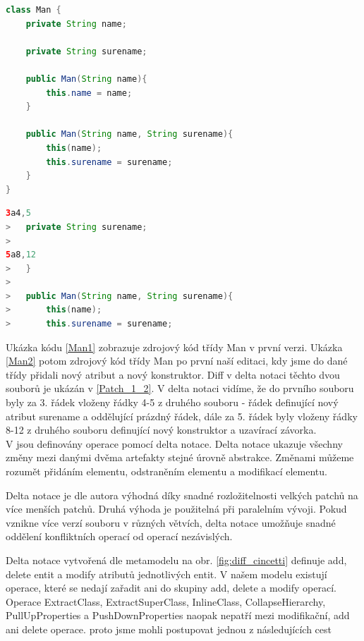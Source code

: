 \documentclass[11pt,twoside,a4paper]{book}
\begin{document}
\begin{lstlisting}[language=JAVA,frame=single,caption=Man2.java,label=Man2]
class Man {
	private String name;

	private String surename;

	public Man(String name){
		this.name = name;
	}

	public Man(String name, String surename){
		this(name);
		this.surename = surename;
	}
}
\end{lstlisting}

\begin{lstlisting}[language=JAVA,frame=single,caption=Patch Man1
Man2,label=Patch_1_2]
3a4,5
> 	private String surename;
> 
5a8,12
> 	}
> 
> 	public Man(String name, String surename){
> 		this(name);
> 		this.surename = surename;	
\end{lstlisting}

Ukázka kódu \ref{Man1} zobrazuje zdrojový kód třídy Man v první
verzi. Ukázka \ref{Man2} potom zdrojový kód třídy Man po první naší editaci,
kdy jsme do dané třídy přidali nový atribut a nový konstruktor.
Diff v delta notaci těchto dvou souborů je ukázán v \ref{Patch_1_2}. V delta
notaci vidíme, že do prvního souboru byly za 3. řádek vloženy řádky 4-5 z
druhého souboru - řádek definující nový atribut surename a oddělující prázdný
řádek, dále za 5. řádek byly vloženy řádky 8-12 z druhého souboru definující
nový konstruktor a uzavírací závorka.\\

V \cite{Cincetti} jsou definovány operace pomocí delta notace. Delta notace
ukazuje všechny změny mezi danými dvěma artefakty stejné úrovně abstrakce.
Změnami můžeme rozumět přidáním elementu, odstraněním elementu a modifikací elementu.

Delta notace je dle autora výhodná díky snadné rozložitelnosti velkých patchů na
více menších patchů. Druhá výhoda je použitelná při paralelním vývoji. Pokud
vznikne více verzí souboru v různých větvích, delta notace umožňuje snadné
oddělení konfliktních operací od operací nezávislých.

Delta notace vytvořená dle metamodelu na obr. \ref{fig:diff_cincetti} definuje
add, delete entit a modify atributů jednotlivých entit. V našem modelu existují
operace, které se nedají zařadit ani do skupiny add, delete a modify operací.
Operace ExtractClass, ExtractSuperClass, InlineClass, CollapseHierarchy,
PullUpProperties a PushDownProperties naopak nepatří mezi modifikační, add ani
delete operace.
proto jsme mohli postupovat jednou z následujících cest
\end{document}
